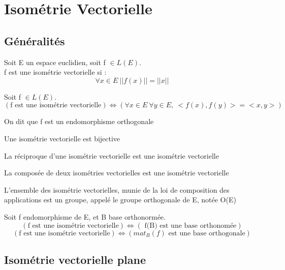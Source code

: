 \chapter{Isométrie Vectorielle}
\section{Généralités}
\begin{de}
Soit E un espace euclidien, soit f $\in L(E)$.\\
f est une isométrie vectorielle si : 
$$\forall x \in E~ ||f(x)||=||x||$$
\end{de}
\begin{prop}
Soit f $\in L(E)$. 
$$(\mbox{f est une isométrie vectorielle}) \Leftrightarrow (\forall x \in E~ \forall y \in E,~ <f(x),f(y)>=<x,y>)$$
\end{prop}
On dit que f est un endomorphisme orthogonale
\begin{prop}
Une isométrie vectorielle est bijective
\end{prop}
\begin{prop}
La réciproque d'une isométrie vectorielle est une isométrie vectorielle
\end{prop}
\begin{prop}
 La composée de deux isométries vectorielles est une isométrie vectorielle
\end{prop}
\begin{prop}
L'ensemble des isométrie vectorielles, munie de la loi de composition des applications est un groupe, appelé le groupe orthogonale de E, notée O(E)
\end{prop}
\begin{prop}
Soit f endomorphisme de E, et B base orthonormée.\\
$$(\mbox{f est une isométrie vectorielle}) \Leftrightarrow (\mbox{ f(B) est une base orthonomée})$$
$$(\mbox{f est une isométrie vectorielle}) \Leftrightarrow (mat_B(f) \mbox{ est une base orthogonale})$$
\end{prop}
\section{Isométrie vectorielle plane}
